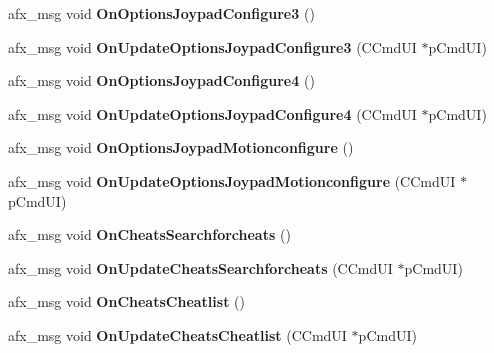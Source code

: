\begin{DoxyCompactItemize}
\mbox{\label{class_main_wnd_a0def1429ded1fc96ecdda38a7e5257b8}} 
afx\+\_\+msg void {\bfseries On\+Options\+Joypad\+Configure3} ()
\item 
\mbox{\label{class_main_wnd_adce78783951780ef126850460c0d058e}} 
afx\+\_\+msg void {\bfseries On\+Update\+Options\+Joypad\+Configure3} (C\+Cmd\+UI $\ast$p\+Cmd\+UI)
\item 
\mbox{\label{class_main_wnd_afc6e9e67b71193dca7d906bb62ad259b}} 
afx\+\_\+msg void {\bfseries On\+Options\+Joypad\+Configure4} ()
\item 
\mbox{\label{class_main_wnd_ab4e1c44549ff60b9c38c2ef34b7139a1}} 
afx\+\_\+msg void {\bfseries On\+Update\+Options\+Joypad\+Configure4} (C\+Cmd\+UI $\ast$p\+Cmd\+UI)
\item 
\mbox{\label{class_main_wnd_a53193c4dc50dce98008dfbd3644ee1ca}} 
afx\+\_\+msg void {\bfseries On\+Options\+Joypad\+Motionconfigure} ()
\item 
\mbox{\label{class_main_wnd_a3fd5aad599ccaff89fc20fb38a7c93d6}} 
afx\+\_\+msg void {\bfseries On\+Update\+Options\+Joypad\+Motionconfigure} (C\+Cmd\+UI $\ast$p\+Cmd\+UI)
\item 
\mbox{\label{class_main_wnd_aab3f78322d45b6e9300a8399b19bf35a}} 
afx\+\_\+msg void {\bfseries On\+Cheats\+Searchforcheats} ()
\item 
\mbox{\label{class_main_wnd_aa8d542452917aad684d8762790c74e96}} 
afx\+\_\+msg void {\bfseries On\+Update\+Cheats\+Searchforcheats} (C\+Cmd\+UI $\ast$p\+Cmd\+UI)
\item 
\mbox{\label{class_main_wnd_a1559502f63289fd4d3414ef1a287b1d8}} 
afx\+\_\+msg void {\bfseries On\+Cheats\+Cheatlist} ()
\item 
\mbox{\label{class_main_wnd_ae88de7e8f7d73a87e5f3bb1ffa28a792}} 
afx\+\_\+msg void {\bfseries On\+Update\+Cheats\+Cheatlist} (C\+Cmd\+UI $\ast$p\+Cmd\+UI)
\item 
\mbox{\label{class_main_wnd_acf3525f8b6804fb4fcc4332d976c9961}} 

\end{DoxyCompactItemize}
